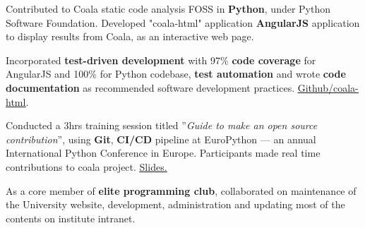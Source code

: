 \documentclass[]{deedy-resume-openfont}
\begin{document}
\begin{minipage}[t]{0.66\textwidth}
\begin{tightemize}
\item Contributed to Coala \textemdash static code analysis FOSS \textemdash in \textbf{Python}, under Python Software Foundation. Developed "coala-html" application \textemdash \textbf{AngularJS} application to display results from Coala, as an interactive web page.
\item Incorporated \textbf{test-driven development} with 97\% \textbf{code coverage} for AngularJS and 100\% for Python codebase, \textbf{test automation} and wrote \textbf{code documentation} as recommended software development practices. \href{https://github.com/coala/coala-html}{\underline {Github/coala-html}}.
\end{tightemize}
\sectionsep

\begin{tightemize}
\item Conducted a 3hrs training session titled ”\textit{Guide to make an open source contribution}”, using \textbf{Git}, \textbf{CI/CD} pipeline at EuroPython — an annual International Python Conference in Europe. Participants made real time contributions to coala project. \href{https://tushar-rishav.github.io/EPGit/#/}{\underline {Slides.}}
\end{tightemize}
\sectionsep

\begin{tightemize}
\item As a core member of \textbf{elite programming club}, collaborated on maintenance of the University website, development, administration and updating most of the contents on institute intranet.
\end{tightemize}
\sectionsep


\end{minipage}
\end{document}

